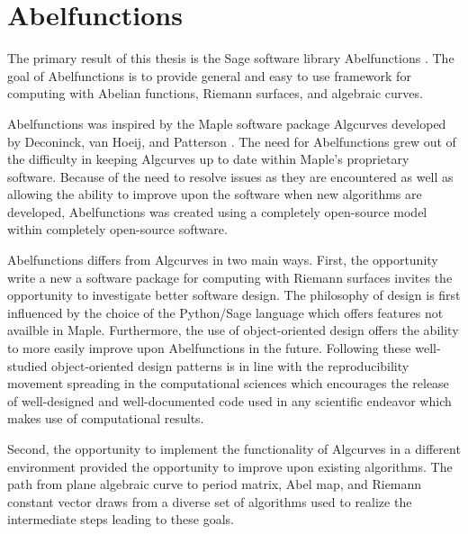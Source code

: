 \chapter{Abelfunctions}

The primary result of this thesis is the Sage software library Abelfunctions
\cite{abelfunctions}. The goal of Abelfunctions is to provide general and easy
to use framework for computing with Abelian functions, Riemann surfaces, and
algebraic curves.

Abelfunctions was inspired by the Maple software package Algcurves developed by
Deconinck, van Hoeij, and Patterson \cite{DeconinckPatterson11}. The need for
Abelfunctions grew out of the difficulty in keeping Algcurves up to date within
Maple's proprietary software. Because of the need to resolve issues as they are
encountered as well as allowing the ability to improve upon the software when
new algorithms are developed, Abelfunctions was created using a completely
open-source model within completely open-source software.

Abelfunctions differs from Algcurves in two main ways. First, the opportunity
write a new a software package for computing with Riemann surfaces invites the
opportunity to investigate better software design. The philosophy of design is
first influenced by the choice of the Python/Sage language which offers features
not availble in Maple. Furthermore, the use of object-oriented design offers the
ability to more easily improve upon Abelfunctions in the future. Following these
well-studied object-oriented design patterns \cite{gamma1995design} is in line
with the reproducibility movement spreading in the computational sciences
\cite{stodden2012reproducible} which encourages the release of well-designed and
well-documented code used in any scientific endeavor which makes use of
computational results.

Second, the opportunity to implement the functionality of Algcurves in a
different environment provided the opportunity to improve upon existing
algorithms. The path from plane algebraic curve to period matrix, Abel map, and
Riemann constant vector draws from a diverse set of algorithms used to realize
the intermediate steps leading to these goals.

